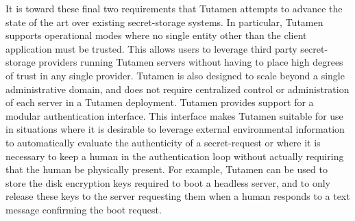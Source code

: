 It is toward these final two requirements that Tutamen attempts to
advance the state of the art over existing secret-storage systems. In
particular, Tutamen supports operational modes where no single entity
other than the client application must be trusted. This allows users
to leverage third party secret-storage providers running Tutamen
servers without having to place high degrees of trust in any single
provider. Tutamen is also designed to scale beyond a single
administrative domain, and does not require centralized control or
administration of each server in a Tutamen deployment. Tutamen
provides support for a modular authentication interface. This
interface makes Tutamen suitable for use in situations where it is
desirable to leverage external environmental information to
automatically evaluate the authenticity of a secret-request or where
it is necessary to keep a human in the authentication loop without
actually requiring that the human be physically present. For example,
Tutamen can be used to store the disk encryption keys required to boot
a headless server, and to only release these keys to the server
requesting them when a human responds to a text message confirming the
boot request.


